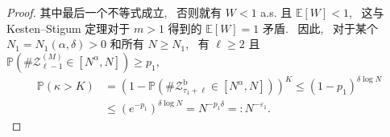 \begin{proof}
{    }{
        其中最后一个不等式成立,~ 否则就有 $W<1$ a.s. 且 $\mathbb E[W]<1$,~ 这与 Kesten--Stigum 定理对于 $m>1$ 得到的 $\mathbb E[W]=1$ 矛盾. ~因此,~ 对于某个 $N_1=N_1(\alpha,\delta)>0$ 和所有 $N\ge N_1$,~ 有 $\ell\ge 2$ 且
    }
    $
        \mathbb P\left(
            \#\mathcal Z^{(M)}_{\ell-1}
            \in[N^\alpha,N]
        \right)
        \ge
        p_1,
    $
    \begin{align}
        \mathbb P\left(
            \kappa>K
        \right)
        &
        =
        \left(
            1
            -
            \mathbb P\left(
                \#\mathcal Z^{\mathrm b}_{\tau_1+\ell}
                \in[N^\alpha,N]
            \right)
        \right)^K
        \le
        (1-p_1)^{\delta\log N}
        \nonumber
        \\
        &
        \le
        (e^{-p_1})^{\delta\log N}
        =
        N^{-p_1\delta}
        =:
        N^{-\varepsilon_1}.
        \label{eq:kappa:bound}
    \end{align}


\end{proof}
